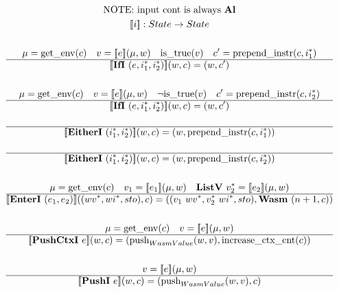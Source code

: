 
\newpage

\begin{gather*}
  \text{NOTE: input cont is always \al} \\
  \sem{i} : State \rightarrow State \\
%
\newline \\
  \mu = \getenv(c) \quad v = \sem{e}(\mu, w) \quad
  \istrue(v) \quad c' = \prependinstr(c, \seq{i_1}) \\
  \hline
  \sem{\ifi ~ (e, \seq{i_1}, \seq{i_2})}(w, c) = (w, c') \\
%
\newline \\
  \mu = \getenv(c) \quad v = \sem{e}(\mu, w) \quad
  \neg \istrue(v) \quad c' = \prependinstr(c, \seq{i_2}) \\
  \hline
  \sem{\ifi ~ (e, \seq{i_1}, \seq{i_2})}(w, c) = (w, c') \\
%
\newline \\
  \hline
  \sem{\eitheri ~ (\seq{i_1}, \seq{i_2})}(w, c) = (w, \prependinstr(c, \seq{i_1})) \\
%
\newline \\
  \hline
  \sem{\eitheri ~ (\seq{i_1}, \seq{i_2})}(w, c) = (w, \prependinstr(c, \seq{i_2})) \\
%
\newline \\
  \mu = \getenv(c) \quad v_1 = \sem{e_1}(\mu, w) \quad \listv ~ \seq{v_2} = \sem{e_2}(\mu, w) \\
  \hline
  \sem{\enteri ~ (e_1, e_2)}((\seq{wv}, \seq{wi}, sto), c)
  =
  ((v_1 ~ \seq{wv}, \seq{v_2} ~ \seq{wi}, sto), \wasm ~ (n+1, c)) \\
%
\newline \\
  \mu = \getenv(c) \quad v = \sem{e}(\mu, w) \\
  \hline
  \sem{\pushctxi ~ e}(w, c)
  =
  (\push_{WasmValue}(w, v), \increasectxcnt(c)) \\
%
\newline \\
  v = \sem{e}(\mu, w) \\
  \hline
  \sem{\pushi ~ e}(w, c) = (\push_{WasmValue}(w, v), c) \\
%
\newline \\

\end{gather*}
